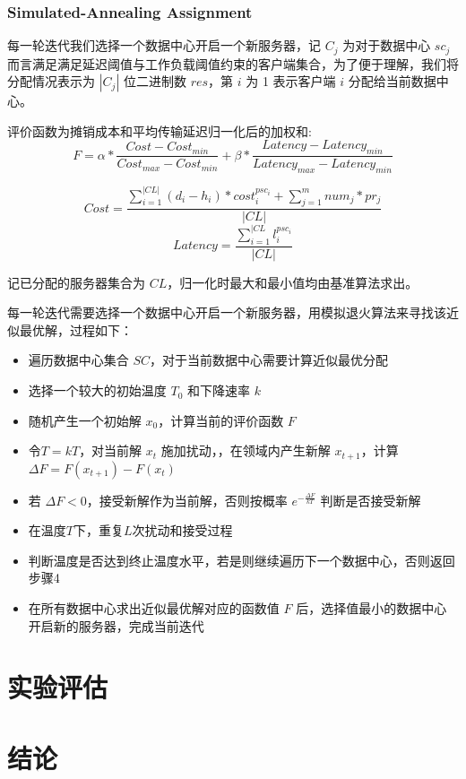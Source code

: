 \subsection{Simulated-Annealing Assignment}
每一轮迭代我们选择一个数据中心开启一个新服务器，记 $C_j$ 为对于数据中心 $sc_j$
而言满足满足延迟阈值与工作负载阈值约束的客户端集合，为了便于理解，我们将分配情况表示为 $|C_j|$
位二进制数 $res$，第 $i$ 为 1 表示客户端 $i$ 分配给当前数据中心。

评价函数为摊销成本和平均传输延迟归一化后的加权和:
$$ F = \alpha*{\frac{Cost - Cost_{min}}{Cost_{max}-Cost_{min}}}
    +\beta*{\frac{Latency-Latency_{min}}{Latency_{max}-Latency_{min}}} $$

$$ Cost = \frac{\sum\limits_{i=1}^{|CL|}{(d_i-h_i)*cost_i^{psc_i}} + \sum\limits_{j=1}^m{num_j}*pr_j}{|CL|} $$
$$ Latency = \frac{\sum\limits_{i=1}^{|CL}{l_i^{psc_i}}}{|CL|} $$

记已分配的服务器集合为 $CL$，归一化时最大和最小值均由基准算法求出。

每一轮迭代需要选择一个数据中心开启一个新服务器，用模拟退火算法来寻找该近似最优解，过程如下：

\begin{itemize}
    \item 遍历数据中心集合 $SC$，对于当前数据中心需要计算近似最优分配
    \item 选择一个较大的初始温度 $T_0$ 和下降速率 $k$
    \item 随机产生一个初始解 $ x_0 $，计算当前的评价函数 $F$
    \item 令$T=kT$，对当前解 $x_t$ 施加扰动，，在领域内产生新解 $x_{t+1}$，计算 $\Delta F = F(x_{t+1})-F(x_t)$
    \item 若 $\Delta F < 0$，接受新解作为当前解，否则按概率 $e^{-\frac{\Delta F}{kT}}$ 判断是否接受新解
    \item 在温度$T$下，重复$L$次扰动和接受过程
    \item 判断温度是否达到终止温度水平，若是则继续遍历下一个数据中心，否则返回步骤4
    \item 在所有数据中心求出近似最优解对应的函数值 $F$ 后，选择值最小的数据中心开启新的服务器，完成当前迭代
\end{itemize}

\chapter{实验评估}

\chapter{结论}
